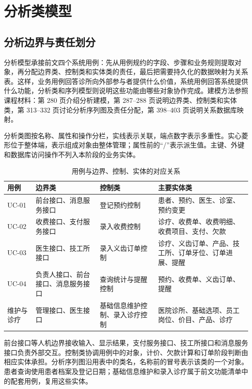 \clearpage
\section{分析类模型}
\subsection{分析边界与责任划分}
分析模型承接前文四个系统用例：先从用例规约的字段、步骤和业务规则提取对象，再分配边界类、控制类和实体类的责任，最后把需要持久化的数据映射为关系表。这样，业务用例回答诊所向外部参与者提供什么价值，系统用例回答系统提供什么功能，分析类和序列模型则说明这些功能由哪些对象协作完成。建模方法参照课程材料：第 280 页介绍分析建模，第 287--288 页说明边界类、控制类和实体类，第 313--332 页讨论分析序列图及责任分配，第 398--403 页说明关系数据库映射。

分析类图按名称、属性和操作分栏，实线表示关联，端点数字表示多重性。实心菱形位于整体端，表示组成对象由整体管理；属性前的“/”表示派生值。主键、外键和数据库访问操作不列入本阶段的业务实体。

\begin{table}[H]
\centering\caption{用例与边界、控制、实体的对应关系}
\small
\begin{tabularx}{\textwidth}{L{1.3cm}L{3.3cm}L{3.4cm}Y}
\toprule
用例 & 边界类 & 控制类 & 主要实体类\\\midrule
UC-01 & 前台接口、消息服务接口 & 登记预约控制 & 患者、预约、医生、诊室、预约变更\\
UC-02 & 收费接口、支付服务接口 & 录入收费控制 & 诊疗、收费单、收费明细、收费项目、支付、欠款\\
UC-03 & 医生接口、技工所接口 & 录入义齿订单控制 & 诊疗、义齿订单、产品、技工所、订单牙位、订单进展、提醒\\
UC-04 & 负责人接口、前台接口、消息服务接口 & 查询统计与提醒控制 & 预约、收费单、义齿订单、提醒\\
维护与诊疗 & 管理接口、医生接口 & 基础信息维护控制、录入诊疗控制 & 医院诊所、基础选项、员工岗位、价目、产品、诊疗\\
\bottomrule
\end{tabularx}
\end{table}

前台接口等人机边界接收输入、显示结果，支付服务接口、技工所接口和消息服务接口负责外部交互。控制类协调用例中的对象，计价、欠款计算和订单阶段判断由相应实体承担。分析序列图沿用表中的类名，名称前的冒号表示该类的一个对象。患者查询使用患者档案及登记日期；基础信息维护和录入诊疗属于前文功能清单中的配套用例，复用这些实体。

